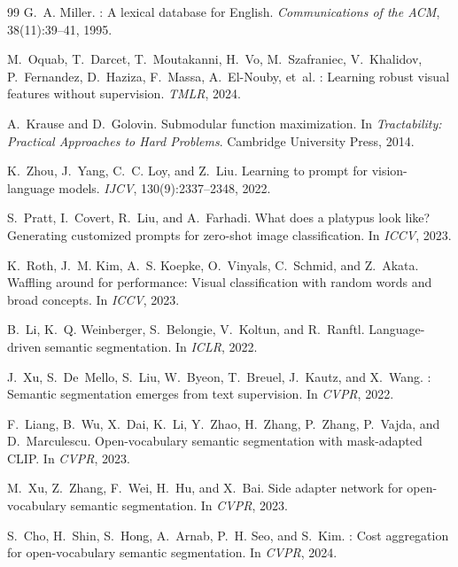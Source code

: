 \documentclass[11pt]{article}
\begin{document}
\begin{thebibliography}{99}
G.~A. Miller.
: A lexical database for {English}.
\newblock \emph{Communications of the ACM}, 38(11):39--41, 1995.

M.~Oquab, T.~Darcet, T.~Moutakanni, H.~Vo, M.~Szafraniec, V.~Khalidov,
  P.~Fernandez, D.~Haziza, F.~Massa, A.~El-Nouby, et~al.
: Learning robust visual features without supervision.
\newblock \emph{TMLR}, 2024.

A.~Krause and D.~Golovin.
\newblock Submodular function maximization.
\newblock In \emph{Tractability: Practical Approaches to Hard Problems}.
  Cambridge University Press, 2014.

K.~Zhou, J.~Yang, C.~C. Loy, and Z.~Liu.
\newblock Learning to prompt for vision-language models.
\newblock \emph{IJCV}, 130(9):2337--2348, 2022.

S.~Pratt, I.~Covert, R.~Liu, and A.~Farhadi.
\newblock What does a platypus look like? {G}enerating customized prompts for
  zero-shot image classification.
\newblock In \emph{ICCV}, 2023.

K.~Roth, J.~M. Kim, A.~S. Koepke, O.~Vinyals, C.~Schmid, and Z.~Akata.
\newblock Waffling around for performance: Visual classification with random
  words and broad concepts.
\newblock In \emph{ICCV}, 2023.

B.~Li, K.~Q. Weinberger, S.~Belongie, V.~Koltun, and R.~Ranftl.
\newblock Language-driven semantic segmentation.
\newblock In \emph{ICLR}, 2022.

J.~Xu, S.~De~Mello, S.~Liu, W.~Byeon, T.~Breuel, J.~Kautz, and X.~Wang.
: Semantic segmentation emerges from text supervision.
\newblock In \emph{CVPR}, 2022.

F.~Liang, B.~Wu, X.~Dai, K.~Li, Y.~Zhao, H.~Zhang, P.~Zhang, P.~Vajda, and
  D.~Marculescu.
\newblock Open-vocabulary semantic segmentation with mask-adapted {CLIP}.
\newblock In \emph{CVPR}, 2023.

M.~Xu, Z.~Zhang, F.~Wei, H.~Hu, and X.~Bai.
\newblock Side adapter network for open-vocabulary semantic segmentation.
\newblock In \emph{CVPR}, 2023.

S.~Cho, H.~Shin, S.~Hong, A.~Arnab, P.~H. Seo, and S.~Kim.
: Cost aggregation for open-vocabulary semantic
  segmentation.
\newblock In \emph{CVPR}, 2024.

\end{thebibliography}
\end{document}

